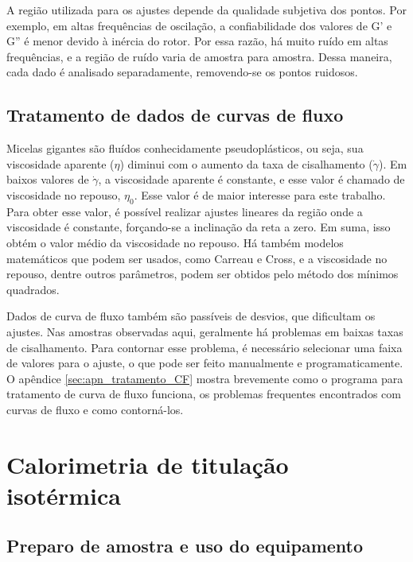 		A região utilizada para os ajustes depende da qualidade subjetiva dos pontos. Por exemplo, em altas frequências de oscilação, a confiabilidade dos valores de G' e G'' é menor devido à inércia do rotor. Por essa razão, há muito ruído em altas frequências, e a região de ruído varia de amostra para amostra. Dessa maneira, cada dado é analisado separadamente, removendo-se os pontos ruidosos.
		
		\section{Tratamento de dados de curvas de fluxo}
		
		Micelas gigantes são fluídos conhecidamente pseudoplásticos, ou seja, sua viscosidade aparente (\(\eta\)) diminui com o aumento da taxa de cisalhamento (\(\dot{\gamma}\)). Em baixos valores de \(\dot{\gamma}\), a viscosidade aparente é constante, e esse valor é chamado de viscosidade no repouso, \(\eta_0\). Esse valor é de maior interesse para este trabalho. Para obter esse valor, é possível realizar ajustes lineares da região onde a viscosidade é constante, forçando-se a inclinação da reta a zero. Em suma, isso obtém o valor médio da viscosidade no repouso. Há também modelos matemáticos que podem ser usados, como Carreau e Cross, e a viscosidade no repouso, dentre outros parâmetros, podem ser obtidos pelo método dos mínimos quadrados.
		
		Dados de curva de fluxo também são passíveis de desvios, que dificultam os ajustes. Nas amostras observadas aqui, geralmente há problemas em baixas taxas de cisalhamento. Para contornar esse problema, é necessário selecionar uma faixa de valores para o ajuste, o que pode ser feito manualmente e programaticamente. O apêndice \ref{sec:apn_tratamento_CF} mostra brevemente como o programa para tratamento de curva de fluxo funciona, os problemas frequentes encontrados com curvas de fluxo e como contorná-los.
		
	\chapter{Calorimetria de titulação isotérmica}
		\section{Preparo de amostra e uso do equipamento}
		\label{sec:preparo_amostra_itc}
		
